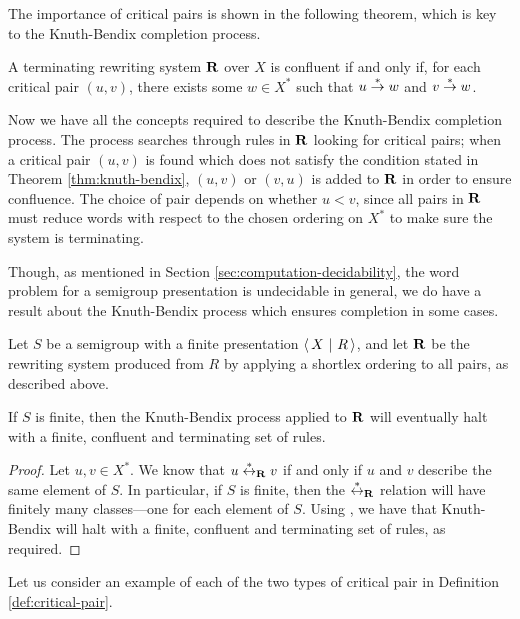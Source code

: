 The importance of critical pairs is shown in the following theorem, which is key
to the Knuth-Bendix completion process.

\begin{theorem}
  \label{thm:knuth-bendix}
  A terminating rewriting system $\mathbf{R}$ over $X$ is confluent if and only if,
  for each critical pair $(u, v)$, there exists some $w \in X^*$ such that
  $u \stackrel{*}{\to} w$ and $v \stackrel{*}{\to} w$.
\end{theorem}

Now we have all the concepts required to describe the Knuth-Bendix completion
process.  The process searches through rules in $\mathbf{R}$ looking for critical
pairs; when a critical pair $(u, v)$ is found which does not satisfy the
condition stated in Theorem \ref{thm:knuth-bendix}, $(u, v)$ or $(v, u)$ is
added to $\mathbf{R}$ in order to ensure confluence.  The choice of pair depends on
whether $u < v$, since all pairs in $\mathbf{R}$ must reduce words with respect to the
chosen ordering on $X^*$ to make sure the system is terminating.

Though, as mentioned in Section \ref{sec:computation-decidability}, the word problem for a
semigroup presentation is undecidable in general, we do have a result about the
Knuth-Bendix process which ensures completion in some cases.

\begin{theorem}
  Let $S$ be a semigroup with a finite presentation $\left\langle\,X ~\middle|~ R\,\right\rangle$, and let $\mathbf{R}$
  be the rewriting system produced from $R$ by applying a shortlex ordering to
  all pairs, as described above.

  If $S$ is finite, then the Knuth-Bendix process applied to $\mathbf{R}$ will
  eventually halt with a finite, confluent and terminating set of rules.

  \begin{proof}
    Let $u,v \in X^*$.  We know that $u \stackrel{*}{\leftrightarrow}_{\mathbf{R}} v$ if and only if $u$ and
    $v$ describe the same element of $S$.  In particular, if $S$ is finite, then
    the $\stackrel{*}{\leftrightarrow}_{\mathbf{R}}$ relation will have finitely many classes---one for each
    element of $S$.  Using \cite[Corollary 12.21]{cgt}, we have that
    Knuth-Bendix will halt with a finite, confluent and terminating set of
    rules, as required.
  \end{proof}
\end{theorem}

Let us consider an example of each of the two types of critical pair in
Definition \ref{def:critical-pair}.

